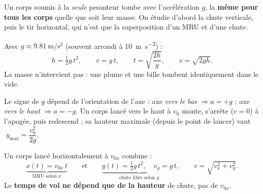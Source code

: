 \documentclass[11pt,a4paper]{article}
\begin{document}

\noindent Un corps soumis à la \emph{seule} pesanteur tombe avec l'accélération $g$, la \textbf{même
pour tous les corps} quelle que soit leur masse. On étudie d'abord la chute verticale, puis le tir
horizontal, qui n'est que la superposition d'un MRU et d'une chute.

\begin{cle}
Avec $g\approx\qty{9,81}{\metre\per\second\squared}$ (souvent arrondi à \qty{10}{\metre\per\second\squared}) :
\[ h=\tfrac12 g\,t^2,\qquad v=g\,t,\qquad t=\sqrt{\frac{2h}{g}},\qquad v=\sqrt{2gh}. \]
La masse n'intervient pas : une plume et une bille tombent identiquement dans le vide.
\end{cle}

\begin{cle}
Le signe de $g$ dépend de l'orientation de l'axe : axe \emph{vers le bas} $\Rightarrow a=+g$ ;
axe \emph{vers le haut} $\Rightarrow a=-g$. Un corps lancé vers le haut à $v_0$ monte, s'arrête
($v=0$) à l'apogée, puis redescend ; sa hauteur maximale (depuis le point de lancer) vaut
$\;y_{\max}=\dfrac{v_0^2}{2g}$.
\end{cle}

\begin{cle}
Un corps lancé horizontalement à $v_{0x}$ combine :
\[ \underbrace{x(t)=v_{0x}\,t}_{\text{MRU selon }x}\qquad\text{et}\qquad
   \underbrace{y(t)=\tfrac12 g\,t^2,\quad v_y=g\,t}_{\text{chute libre selon }y},\qquad
   v=\sqrt{v_x^2+v_y^2}. \]
Le \textbf{temps de vol ne dépend que de la hauteur} de chute, pas de $v_{0x}$.
\begin{center}
\end{center}
\end{cle}
\end{document}
